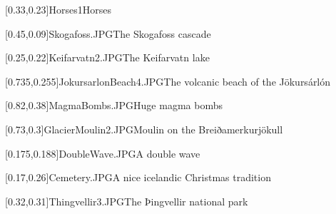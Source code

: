 



\graphicspath{{Figures/}{Figures/Iceland/}}


\subtitle{Day 3}
\date{09.10.2019}


    [0.33,0.23]{Horses1}{Horses}
    
    
    [0.45,0.09]{Skogafoss.JPG}{The Skogafoss cascade}
    
    [0.25,0.22]{Keifarvatn2.JPG}{The Keifarvatn lake}
    
    [0.735,0.255]{JokursarlonBeach4.JPG}{The volcanic beach of the J\"okurs\'arl\'on}
    
    [0.82,0.38]{MagmaBombs.JPG}{Huge magma bombs}
    
    [0.73,0.3]{GlacierMoulin2.JPG}{Moulin on the Breiðamerkurj\"okull}
    
    [0.175,0.188]{DoubleWave.JPG}{A double wave}
    
    
    
    [0.17,0.26]{Cemetery.JPG}{A nice icelandic Christmas tradition}
    
    [0.32,0.31]{Thingvellir3.JPG}{The Þingvellir national park}
    

